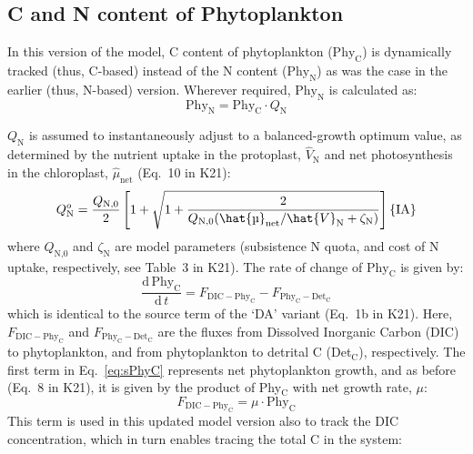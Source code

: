 \documentclass[gmd, manuscript]{copernicus}
\begin{document}
\subsection{C and N content of Phytoplankton}
In this version of the model, C content of phytoplankton ($\text{Phy}_{\text{C}}$) is dynamically tracked (thus, C-based) instead of the N content ($\text{Phy}_{\text{N}}$) as was the case in the earlier (thus, N-based) version. Wherever required, $\text{Phy}_{\text{N}}$ is calculated as:
\begin{equation} \label{eq:Q}
  \text{Phy}_{\text{N}} = \text{Phy}_{\text{C}} \cdot Q_{\text{N}}
\end{equation}

$Q_{\text{N}}$ is assumed to instantaneously adjust to a balanced-growth optimum value, as determined by the nutrient uptake in the protoplast, $\hat{V}_{\text{N}}$ and net photosynthesis in the chloroplast, $\hat{\mu}_{\text{net}}$ (Eq.~10 in K21):
\begin{equation}\label{eq:Qopt}
 Q_{\text{N}}^o= \frac{Q_{\text{N,0}}}{2} \left[1+\sqrt{1+\frac{2}{Q_{\text{N,0}}{({\hat{\mu}_{\text{net}}}/{\hat{V}_{\text{N}}}+\zeta_{\text{N}} )}}} \right] \hfill \{\text{IA}\}
\end{equation}
where $Q_{\text{N,0}}$ and $\zeta_{\text{N}}$ are model parameters (subsistence N quota, and cost of N uptake, respectively, see Table~3 in K21). The rate of change of $\text{Phy}_{\text{C}}$ is given by:
\begin{equation} \label{eq:sPhyC}
\frac{\mathrm{d}\, \text{Phy}_{\text{C}}}{\mathrm{d}\, t} = F_{\text{DIC}-\text{Phy}_{\text{C}}} - F_{\text{Phy}_{\text{C}}-\text{Det}_{\text{C}}}
\end{equation}
which is identical to the source term of the `DA' variant (Eq.~1b in K21). Here, $F_{\text{DIC}-\text{Phy}_{\text{C}}}$ and $F_{\text{Phy}_{\text{C}}-\text{Det}_{\text{C}}}$ are the fluxes from Dissolved Inorganic Carbon (DIC) to phytoplankton, and from phytoplankton to detrital C (Det$_{\text{C}}$), respectively. The first term in Eq.~\eqref{eq:sPhyC} represents net phytoplankton growth, and as before (Eq.~8 in K21), it is given by the product of Phy$_{\text{C}}$ with net growth rate, $\mu$:
\begin{equation} \label{eq:fdicphyc}
 F_{\text{DIC}-\text{Phy}_{\text{C}}} = \mu \cdot \text{Phy}_{\text{C}}
\end{equation}
This term is used in this updated model version also to track the DIC concentration, which in turn enables tracing the total C in the system:
\end{document}
